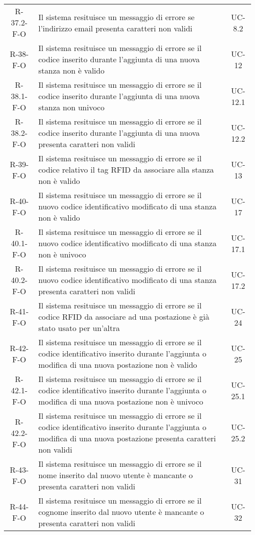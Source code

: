 \begin{longtable}{ c C{9.5cm} c }
    R-37.2-F-O & Il sistema resituisce un messaggio di errore se l'indirizzo email presenta caratteri non validi& UC-8.2\\
    R-38-F-O & Il sistema resituisce un messaggio di errore se il codice inserito durante l'aggiunta di una nuova stanza non è valido& UC-12\\
    R-38.1-F-O & Il sistema resituisce un messaggio di errore se il codice inserito durante l'aggiunta di una nuova stanza non univoco& UC-12.1\\
    R-38.2-F-O & Il sistema resituisce un messaggio di errore se il codice inserito durante l'aggiunta di una nuova presenta caratteri non validi& UC-12.2\\
    R-39-F-O & Il sistema resituisce un messaggio di errore se il codice relativo il tag RFID da associare alla stanza non è valido& UC-13\\
    R-40-F-O & Il sistema resituisce un messaggio di errore se il nuovo codice identificativo modificato di una stanza non è valido& UC-17\\
    R-40.1-F-O & Il sistema resituisce un messaggio di errore se il nuovo codice identificativo modificato di una stanza non è univoco& UC-17.1\\
    R-40.2-F-O & Il sistema resituisce un messaggio di errore se il nuovo codice identificativo modificato di una stanza presenta caratteri non validi& UC-17.2\\
    R-41-F-O & Il sistema resituisce un messaggio di errore se il codice RFID da associare ad una postazione è già stato usato per un'altra& UC-24\\
    R-42-F-O & Il sistema resituisce un messaggio di errore se il codice identificativo inserito durante l'aggiunta o modifica di una nuova postazione non è valido& UC-25\\
    R-42.1-F-O & Il sistema resituisce un messaggio di errore se il codice identificativo inserito durante l'aggiunta o modifica di una nuova postazione non è univoco& UC-25.1\\
    R-42.2-F-O & Il sistema resituisce un messaggio di errore se il codice identificativo inserito durante l'aggiunta o modifica di una nuova postazione presenta caratteri non validi& UC-25.2\\
    R-43-F-O & Il sistema resituisce un messaggio di errore se il nome inserito dal nuovo utente è mancante o presenta caratteri non validi& UC-31\\
    R-44-F-O & Il sistema resituisce un messaggio di errore se il cognome inserito dal nuovo utente è mancante o presenta caratteri non validi& UC-32\\

\end{longtable}
